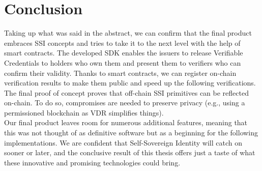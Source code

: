 \chapter*{Conclusion}
Taking up what was said in the abstract, we can confirm that the final product embraces 
SSI concepts and tries to take it to the next level with the help of smart contracts.  
The developed SDK enables the issuers to release Verifiable Credentials to holders who 
own them and present them to verifiers who can confirm their validity. Thanks to smart 
contracts, we can register on-chain verification results to make them public and speed 
up the following verifications. The final proof of concept proves that off-chain SSI 
primitives can be reflected on-chain. To do so, compromises are needed to preserve 
privacy (e.g., using a permissioned blockchain as VDR simplifies things).
\vspace{0.3cm}\\
Our final product leaves room for numerous additional features, meaning that this was 
not thought of as definitive software but as a beginning for the following implementations.
We are confident that Self-Sovereign Identity will catch on sooner or later, and the 
conclusive result of this thesis offers just a taste of what these innovative and
promising technologies could bring.